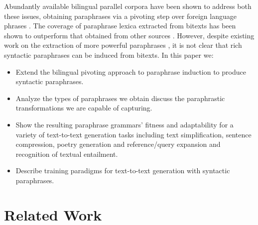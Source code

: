 \documentclass[11pt]{article}
\begin{document}
Abundantly available bilingual parallel corpora have been shown to
address both these issues, obtaining paraphrases via a pivoting step
over foreign language phrases \cite{Callison-Burch2005}. The coverage
of paraphrase lexica extracted from bitexts has been shown to
outperform that obtained from other sources \cite{Zhao2008b}. However,
despite existing work on the extraction of more powerful paraphrases
\cite{Madnani2007,Callison-Burch2008,Zhao2008}, it is not clear that
rich syntactic paraphrases can be induced from bitexts. In this paper
we:
\begin{itemize}
\item Extend the bilingual pivoting approach to paraphrase induction
  to produce syntactic paraphrases.
\item Analyze the types of paraphrases we obtain discuss the
  paraphrastic transformations we are capable of capturing.
\item Show the resulting paraphrase grammars' fitness and adaptability
  for a variety of text-to-text generation tasks including text
  simplification, sentence compression, poetry generation and
  reference/query expansion and recognition of textual entailment.
\item Describe training paradigms for text-to-text generation with
  syntactic paraphrases. 
\end{itemize}


\section{Related Work} \label{related_work}
\end{document}
